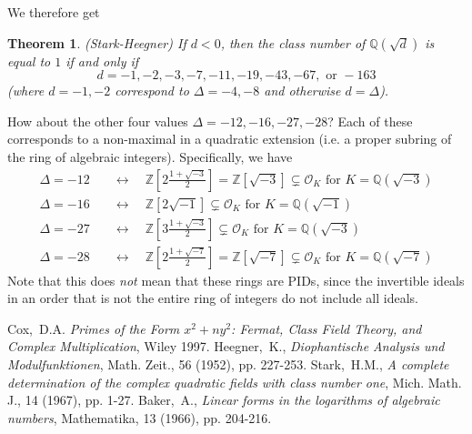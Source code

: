 \documentclass[12pt]{article}
\newcommand{\Ints}{\mathbb{Z}}
\newcommand{\Rats}{\mathbb{Q}}
\newcommand{\Alg}{\mathcal{O}}
\newtheorem{thm}{Theorem}
\theoremstyle{definition}
\begin{document}
We therefore get
\begin{thm} (Stark-Heegner)
\newline
If $d < 0$, then the class number of $\Rats(\sqrt{d})$ is equal to $1$ if and only if
\[d = -1, -2, -3, -7, -11, -19, -43, -67, \text{ or }-163\]
(where $d=-1,-2$ correspond to $\Delta=-4,-8$ and otherwise $d=\Delta$).
\end{thm}

How about the other four values $\Delta=-12,-16,-27,-28$? Each of these corresponds to a non-maximal  in a quadratic extension (i.e. a proper subring of the ring of algebraic integers). Specifically, we have
\begin{align*}
\Delta=-12\quad&\leftrightarrow\quad \Ints\left[2\frac{1+\sqrt{-3}}{2}\right]=\Ints[\sqrt{-3}]\subsetneq \Alg_K\text{ for }K=\Rats(\sqrt{-3})\\
\Delta=-16\quad&\leftrightarrow\quad \Ints[2\sqrt{-1}]\subsetneq \Alg_K\text{ for }K=\Rats(\sqrt{-1})\\
\Delta=-27\quad&\leftrightarrow\quad \Ints\left[3\frac{1+\sqrt{-3}}{2}\right]\subsetneq \Alg_K\text{ for }K=\Rats(\sqrt{-3})\\
\Delta=-28\quad&\leftrightarrow\quad \Ints\left[2\frac{1+\sqrt{-7}}{2}\right]=\Ints[\sqrt{-7}]\subsetneq \Alg_K\text{ for }K=\Rats(\sqrt{-7})
\end{align*}
Note that this does \emph{not} mean that these rings are PIDs, since the invertible ideals in an order that is not the entire ring of integers do not include all ideals.
\begin{thebibliography}{10}
Cox,~D.A. \emph{Primes of the Form $x^2 + ny^2$: Fermat, Class Field Theory, and Complex Multiplication}, Wiley 1997.
Heegner,~K., \emph{Diophantische Analysis und Modulfunktionen}, Math. Zeit., 56 (1952), pp. 227-253. 
Stark,~H.M., \emph{A complete determination of the complex quadratic fields with class number one}, Mich. Math. J., 14 (1967), pp. 1-27.
Baker,~A., \emph{Linear forms in the logarithms of algebraic numbers}, Mathematika, 13 (1966), pp. 204-216. 
\end{thebibliography}
\end{document}
